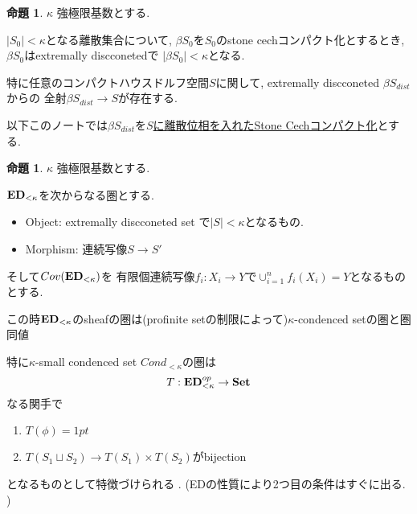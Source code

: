 \documentclass[dvipdfmx,a4paper,11pt]{article}
\theoremstyle{definition}
\newtheorem{prop}[thm]{命題}
\begin{document}
   \begin{tcolorbox}
 [colback = white, colframe = green!35!black, fonttitle = \bfseries,breakable = true]
\begin{prop}\cite[Example 2.5]{Sch19}
\label{prop-sch-exa2.5}
$\kappa$ 強極限基数とする.

$|S_0| <\kappa$となる離散集合について, 
$\beta S_0$を$S_0$のstone cechコンパクト化とするとき,
 $\beta S_0$はextremally discconetedで
$|\beta S_0 | < \kappa$となる.

特に任意のコンパクトハウスドルフ空間$S$に関して, extremally discconeted $\beta S_{dist}$からの
全射$\beta S_{dist} \to S$が存在する. 

 \end{prop}
 \end{tcolorbox}
 
 以下このノートでは$\beta S_{dist}$を\underline{$S$に離散位相を入れたStone Cechコンパクト化}とする. 
 
   \begin{tcolorbox}
 [colback = white, colframe = green!35!black, fonttitle = \bfseries,breakable = true]
\begin{prop}\cite[Example 2.5]{Sch19}
$\kappa$ 強極限基数とする.

${\bf ED}_{< \kappa}$を次からなる圏とする.
\begin{itemize}
\item Object: extremally discconeted set で$|S| < \kappa$となるもの. 
\item Morphism: 連続写像$S \to S'$
\end{itemize}

そして$Cov({\bf ED}_{< \kappa})$を
有限個連続写像$f_i : X_i \to Y$で$\cup_{i=1}^{n}f_i(X_i) =Y$となるものとする. 

この時${\bf ED}_{< \kappa}$のsheafの圏は(profinite setの制限によって)$\kappa$-condenced setの圏と圏同値
 \end{prop}
 \end{tcolorbox}
 
特に$\kappa$-small condenced set $Cond_{<\kappa}$の圏は
$$
T : {\bf ED}_{< \kappa}^{op} \to {\bf Set}
$$
なる関手で
\begin{enumerate}
\item $T(\phi) = 1pt$
\item $T(S_1 \sqcup S_2) \to T(S_1) \times T(S_2)$がbijection
\end{enumerate}
となるものとして特徴づけられる .
(EDの性質により2つ目の条件はすぐに出る. )
\end{document}
